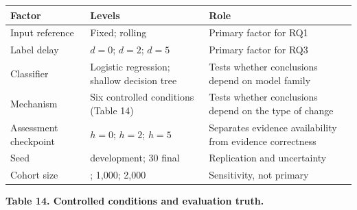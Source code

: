 \documentclass[
]{article}
\begin{document}
\begin{longtable}[]{@{}
  >{\raggedright\arraybackslash}p{}
  >{\raggedright\arraybackslash}p{}
  >{\raggedright\arraybackslash}p{}@{}}
\toprule
Factor & Levels & Role \\
\midrule
\endhead
Input reference & Fixed; rolling & Primary factor for RQ1 \\
Label delay & \(d=0\); \(d=2\); \(d=5\) & Primary factor for RQ3 \\
Classifier & Logistic regression; shallow decision tree & Tests whether
conclusions depend on model family \\
Mechanism & Six controlled conditions (Table 14) & Tests whether
conclusions depend on the type of change \\
Assessment checkpoint & \(h=0\); \(h=2\); \(h=5\) & Separates evidence
availability from evidence correctness \\
Seed & 5 development; 30 final & Replication and uncertainty \\
Cohort size & 500; 1,000; 2,000 & Sensitivity, not primary \\
\bottomrule
\end{longtable}

\textbf{Table 14. Controlled conditions and evaluation truth.}
\end{document}
